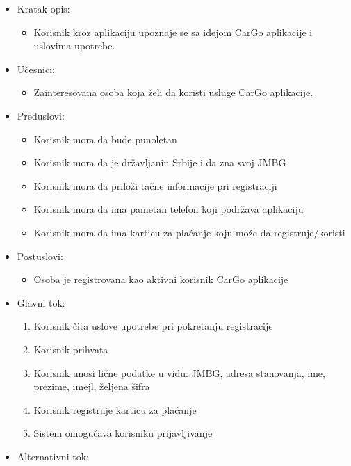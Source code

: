 \begin{itemize}
    \item Kratak opis:
        \begin{itemize}
            \item Korisnik kroz aplikaciju upoznaje se sa idejom CarGo aplikacije i uslovima upotrebe.
        \end{itemize}
    \item Učesnici:
        \begin{itemize}
            \item Zainteresovana osoba koja želi da koristi usluge CarGo aplikacije.
        \end{itemize}
    \item Preduslovi:
        \begin{itemize}
            \item Korisnik mora da bude punoletan
            \item Korisnik mora da je državljanin Srbije i da zna svoj JMBG
            \item Korisnik mora da priloži tačne informacije pri registraciji
            \item Korisnik mora da ima pametan telefon koji podržava aplikaciju
            \item Korisnik mora da ima karticu za plaćanje koju može da registruje/koristi
        \end{itemize}
    \item Postuslovi:
        \begin{itemize}
            \item Osoba je registrovana kao aktivni korisnik CarGo aplikacije
        \end{itemize}
    \item Glavni tok:
        \begin{enumerate}
            \item Korisnik čita uslove upotrebe pri pokretanju registracije
            \item Korisnik prihvata 
            \item Korisnik unosi lične podatke u vidu: JMBG, adresa stanovanja, ime, prezime, imejl, željena šifra
            \item Korisnik registruje karticu za plaćanje
            \item Sistem omogućava korisniku prijavljivanje
        \end{enumerate}
    \item Alternativni tok:
        \begin{itemize}

\end{itemize}
\end{itemize}
